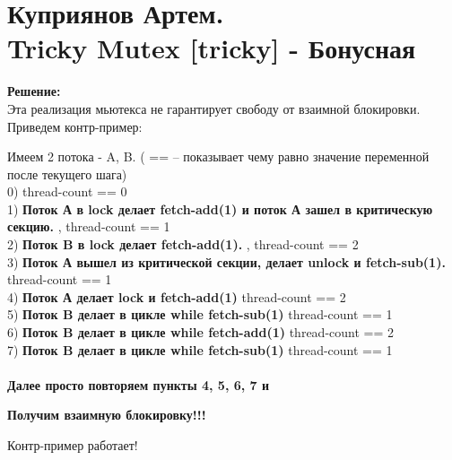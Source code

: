 \documentclass[a4paper,12pt]{paper} %
\begin{document}
\section{Куприянов Артем. \\ Tricky Mutex [tricky] - Бонусная} 
\textbf{Решение: } \\
Эта реализация мьютекса не гарантирует свободу от взаимной блокировки. Приведем контр-пример:

Имеем 2 потока - A, B.
( == -- показывает чему равно значение переменной после текущего шага) \\
0) thread-count == 0 \\ 
1) \textbf{Поток А в lock делает fetch-add(1) и поток А зашел в критическую секцию.  }, thread-count == 1 \\
2) \textbf{Поток B в lock делает fetch-add(1). }, thread-count == 2 \\
3) \textbf{Поток А вышел из критической секции, делает unlock и fetch-sub(1). } thread-count == 1 \\
4) \textbf{Поток А делает lock и fetch-add(1)} thread-count == 2 \\
5) \textbf{Поток B делает в цикле while fetch-sub(1)} thread-count == 1 \\
6) \textbf{Поток B делает в цикле while fetch-add(1)} thread-count == 2 \\
7) \textbf{Поток B делает в цикле while fetch-sub(1)} thread-count == 1 \\ \\
\textbf{ Далее просто повторяем пункты 4, 5, 6, 7 и }

\textbf{Получим взаимную блокировку!!!}


Контр-пример работает!
\end{document}
